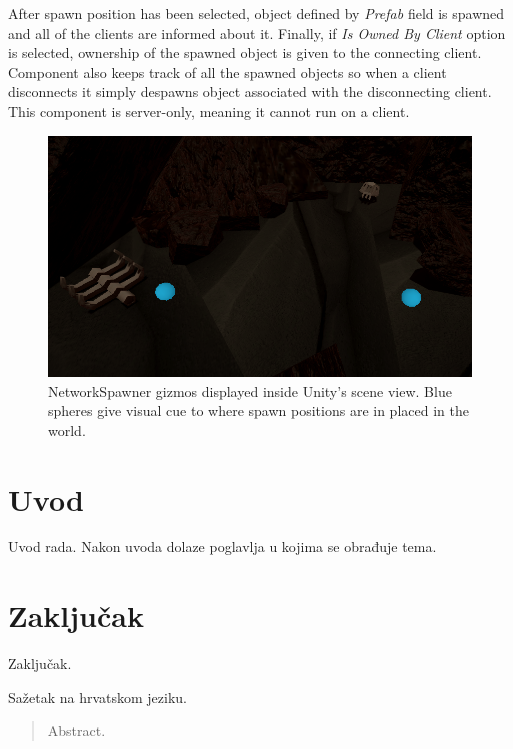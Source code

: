 \documentclass[times, utf8, diplomski]{fer}
\begin{document}
After spawn position has been selected, object defined by \textit{Prefab} field is spawned and all of the clients are informed about it. Finally, if \textit{Is Owned By Client} option is selected, ownership of the spawned object is given to the connecting client. \\

Component also keeps track of all the spawned objects so when a client disconnects it simply despawns object associated with the disconnecting client. This component is server-only, meaning it cannot run on a client.

\begin{figure}[H]
	\centering
	\includegraphics[scale=0.65]{NetworkSpawner-example}
	\caption{NetworkSpawner gizmos displayed inside Unity's scene view. Blue spheres give visual cue to where spawn positions are in placed in the world.}
\end{figure}

\chapter{Uvod}
Uvod rada. Nakon uvoda dolaze poglavlja u kojima se obrađuje tema.

\chapter{Zaključak}
Zaključak.




\begin{sazetak}
Sažetak na hrvatskom jeziku.

\end{sazetak}

\begin{abstract}
Abstract.

\end{abstract}
\end{document}

